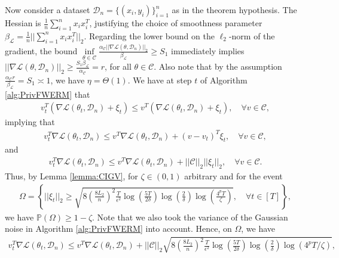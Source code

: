 \documentclass{article}
\begin{document}
Now consider a dataset $\mathcal{D}_n = \{(x_i, y_i)\}_{i = 1}^n$ as in the theorem hypothesis. The Hessian is $\frac{1}{n}\sum_{i = 1}^nx_ix_i^T$, justifying the choice of smoothness parameter $\beta_{\mathcal{L}} = \frac{1}{n}||\sum_{i = 1}^n x_ix_i^T||_2$. Regarding the lower bound on the $\ell_2$-norm of the gradient, the bound $\mathop{\inf}\limits_{\theta \in \mathcal{C}}\frac{\alpha_{\mathcal{C}}||\nabla \mathcal{L}(\theta, \mathcal{D}_n)||_2}{\beta_{\mathcal{L}}} \geq S_1$ immediately implies $||\nabla \mathcal{L}(\theta, \mathcal{D}_n)||_2 \geq \frac{S_1\beta_{\mathcal{L}}}{\alpha_{\mathcal{C}}} = r$, for all $\theta \in \mathcal{C}$.
Also note that by the assumption $\frac{\alpha_{\mathcal{C}} r}{\beta_{\mathcal{L}}} = S_1 \asymp 1$, we have
$\eta = \Theta\left(1\right)$. We have at step $t$ of Algorithm \ref{alg:PrivFWERM} that 
\begin{align*}
v_t^T(\nabla \mathcal{L}(\theta_t, \mathcal{D}_n) + \xi_t) \leq v^T(\nabla \mathcal{L}(\theta_t, \mathcal{D}_n) + \xi_t), \quad \forall v \in \mathcal{C},
\end{align*}
implying that
\begin{align*}
v_t^T\nabla \mathcal{L}(\theta_t, \mathcal{D}_n) \leq v^T\nabla \mathcal{L}(\theta_t, \mathcal{D}_n) + (v - v_t)^T\xi_t, \quad \forall v \in \mathcal{C},
\end{align*}
and
\begin{align*}
v_t^T\nabla \mathcal{L}(\theta_t, \mathcal{D}_n) \leq v^T\nabla \mathcal{L}(\theta_t, \mathcal{D}_n) + ||\mathcal{C}||_2||\xi_t||_2, \quad \forall v \in \mathcal{C}.
\end{align*}
Thus, by Lemma \ref{lemma:CIGV}, for $\zeta \in (0, 1)$ arbitrary and for the event
\begin{align*}
\Omega = \left\{||\xi_t||_2 \geq \sqrt{8\left(\frac{8L_2}{n}\right)^2\frac{T}{\epsilon^2} \log\left(\frac{5T}{2\delta}\right)\log\left(\frac{2}{\delta}\right)\log\left(\frac{4^pT}{\zeta}\right)}, \quad  \forall t \in [T] \right\},
\end{align*}
we have $\mathbb{P}(\Omega) \geq 1 - \zeta$. Note that we also took the variance of the Gaussian noise in Algorithm \ref{alg:PrivFWERM} into account.
Hence, on $\Omega$, we have
\begin{align*}
v_t^T\nabla \mathcal{L}(\theta_t, \mathcal{D}_n) \leq v^T\nabla \mathcal{L}(\theta_t, \mathcal{D}_n) + ||\mathcal{C}||_2\sqrt{8\left(\frac{8L_2}{n}\right)^2\frac{T}{\epsilon^2} \log\left(\frac{5T}{2\delta}\right)\log\left(\frac{2}{\delta}\right)\log(4^pT/\zeta)},
\end{align*}
\end{document}
